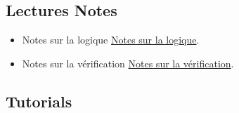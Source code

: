 \documentclass[ 12pt]{article}
\begin{document}
  



  \subsection{Lectures Notes}

  \begin{itemize}
  \item[]   Notes sur la logique
    \href{http://mery54.github.io/teaching/movex/lecturesnotes/preprint-chapterlogique.pdf}{Notes sur la logique}.

     \item[]   Notes sur la vérification
    \href{http://mery54.github.io/teaching/movex/lecturesnotes/preprint-chapterverification.pdf}{Notes sur la vérification}.

  \end{itemize}


  

\subsection{Tutorials}
\end{document}
